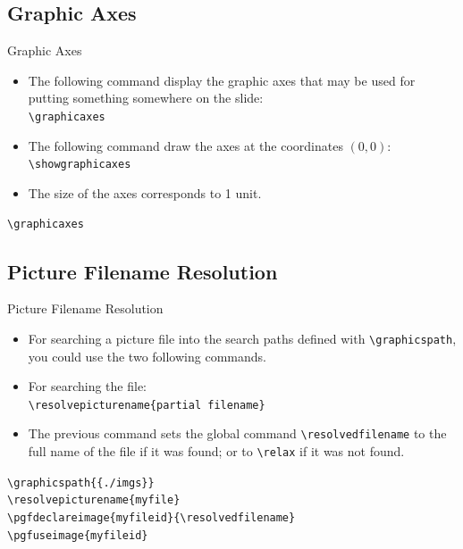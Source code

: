 \documentclass[english,sectioncirclenumberstyle]{ciadbeamer}
\begin{document}
\subsection{Graphic Axes}

\begin{frame}{Graphic Axes}
	\begin{itemize}
	\item The following command display the graphic axes that may be used for putting something somewhere on the slide: \\
		\texttt{{\textbackslash}graphicaxes}
	\item The following command draw the axes at the coordinates $(0,0)$: \\
		\texttt{{\textbackslash}showgraphicaxes}
	\item The size of the axes corresponds to 1 unit.
	\end{itemize}
	\begin{example}
		\texttt{{\textbackslash}graphicaxes}\\
		\graphicaxes
	\end{example}
\end{frame}

\subsection{Picture Filename Resolution}

\begin{frame}{Picture Filename Resolution}
	\begin{itemize}
	\item For searching a picture file into the search paths defined with \texttt{{\textbackslash}graphicspath}, you could use the two following commands.
	\item For searching the file: \\
		\texttt{{\textbackslash}resolvepicturename\{partial filename\}}
	\item The previous command sets the global command \texttt{{\textbackslash}resolvedfilename} to the full name of the file if it was found; or to \texttt{{\textbackslash}relax} if it was not found.
	\end{itemize}
	\begin{example}
		\texttt{{\textbackslash}graphicspath\{\{./imgs\}\}} \\
		\texttt{{\textbackslash}resolvepicturename\{myfile\}} \\
		\texttt{{\textbackslash}pgfdeclareimage\{myfileid\}\{{\textbackslash}resolvedfilename\}} \\
		\texttt{{\textbackslash}pgfuseimage\{myfileid\}} \\
	\end{example}
\end{frame}
\end{document}
